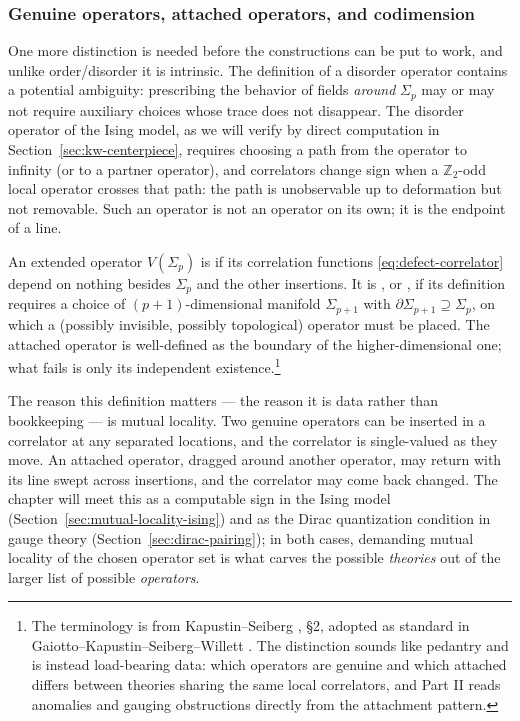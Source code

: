 \subsubsection{Genuine operators, attached operators, and codimension}
\label{sec:genuine}

One more distinction is needed before the constructions can be put to
work, and unlike order/disorder it is intrinsic. The definition of a
disorder operator contains a potential ambiguity: prescribing the behavior
of fields \emph{around} $\Sigma_p$ may or may not require auxiliary
choices whose trace does not disappear. The disorder operator of the
Ising model, as we will verify by direct computation in
Section~\ref{sec:kw-centerpiece}, requires choosing a path from the
operator to infinity (or to a partner operator), and correlators change
sign when a $\mathbb{Z}_2$-odd local operator crosses that path: the path is
unobservable up to deformation but not removable. Such an operator is not
an operator on its own; it is the endpoint of a line.

\begin{ddefinition}
\label{def:genuine}
An extended operator $V(\Sigma_p)$ is  if its correlation
functions \eqref{eq:defect-correlator} depend on nothing besides
$\Sigma_p$ and the other insertions. It is , or
, if its definition requires a choice of
$(p+1)$-dimensional manifold $\Sigma_{p+1}$ with $\partial\Sigma_{p+1}
\supseteq \Sigma_p$, on which a (possibly invisible, possibly topological)
operator must be placed. The attached operator is well-defined as the
boundary of the higher-dimensional one; what fails is only its
independent existence.\footnote{The terminology is from Kapustin--Seiberg
, \S2, adopted as standard in
Gaiotto--Kapustin--Seiberg--Willett . The distinction
sounds like pedantry and is instead load-bearing data: which operators
are genuine and which attached differs between theories sharing the same
local correlators, and Part II reads anomalies and gauging obstructions
directly from the attachment pattern.}
\end{ddefinition}

\noin The reason this definition matters --- the reason it is data rather
than bookkeeping --- is mutual locality. Two genuine operators can be
inserted in a correlator at any separated locations, and the correlator is
single-valued as they move. An attached operator, dragged around another
operator, may return with its line swept across insertions, and the
correlator may come back changed. The chapter will meet this as a
computable sign in the Ising model
(Section~\ref{sec:mutual-locality-ising}) and as the Dirac quantization
condition in gauge theory (Section~\ref{sec:dirac-pairing}); in both
cases, demanding mutual locality of the chosen operator set is what
carves the possible \emph{theories} out of the larger list of possible
\emph{operators}.

